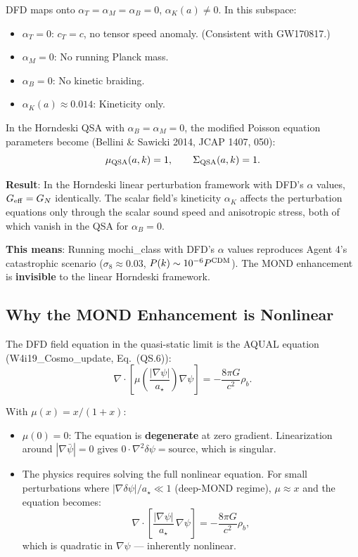 \documentclass[11pt]{article}
\theoremstyle{definition}
\theoremstyle{remark}
\newcommand{\Geff}{G_{\rm eff}}
\newcommand{\astar}{a_\star}
\begin{document}
DFD maps onto $\alpha_T = \alpha_M = \alpha_B = 0$, $\alpha_K(a)
\neq 0$. In this subspace:
\begin{itemize}
\item $\alpha_T = 0$: $c_T = c$, no tensor speed anomaly.
  (Consistent with GW170817.)
\item $\alpha_M = 0$: No running Planck mass.
\item $\alpha_B = 0$: No kinetic braiding.
\item $\alpha_K(a) \approx 0.014$: Kineticity only.
\end{itemize}

In the Horndeski QSA with $\alpha_B = \alpha_M = 0$, the modified
Poisson equation parameters become (Bellini \& Sawicki 2014,
JCAP 1407, 050):
\begin{equation}
\mu_{\rm QSA}(a,k) = 1, \qquad \Sigma_{\rm QSA}(a,k) = 1.
\label{eq:horn-QSA-DFD}
\end{equation}

\textbf{Result}: In the Horndeski linear perturbation framework with
DFD's $\alpha$ values, $\Geff = G_N$ identically. The scalar field's
kineticity $\alpha_K$ affects the perturbation equations only through
the scalar sound speed and anisotropic stress, both of which vanish
in the QSA for $\alpha_B = 0$.

\textbf{This means}: Running mochi\_class with DFD's $\alpha$ values
reproduces Agent 4's catastrophic scenario ($\sigma_8 \approx 0.03$,
$P(k) \sim 10^{-6} P^{\rm CDM}$). The MOND enhancement is
\textbf{invisible} to the linear Horndeski framework.

\subsection{Why the MOND Enhancement is Nonlinear}

The DFD field equation in the quasi-static limit is the AQUAL equation
(W4i19\_Cosmo\_update, Eq.~(QS.6)):
\begin{equation}
\nabla\cdot\!\left[\mu\!\left(\frac{|\nabla\psi|}{\astar}\right)
\nabla\psi\right] = -\frac{8\pi G}{c^2}\rho_b.
\label{eq:AQUAL}
\end{equation}

With $\mu(x) = x/(1+x)$:
\begin{itemize}
\item $\mu(0) = 0$: The equation is \textbf{degenerate} at zero
  gradient. Linearization around $|\nabla\bar\psi| = 0$ gives
  $0 \cdot \nabla^2\delta\psi = \text{source}$, which is singular.
\item The physics requires solving the full nonlinear equation.
  For small perturbations where $|\nabla\delta\psi|/\astar \ll 1$
  (deep-MOND regime), $\mu \approx x$ and the equation becomes:
  \begin{equation}
  \nabla\cdot\!\left[\frac{|\nabla\psi|}{\astar}\,\nabla\psi\right]
  = -\frac{8\pi G}{c^2}\rho_b,
  \end{equation}
  which is quadratic in $\nabla\psi$ --- inherently nonlinear.
\end{itemize}
\end{document}
